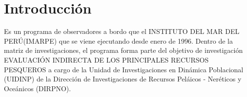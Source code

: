 \documentclass[a4paper,oneside,11pt]{book}
\begin{document}
\sloppy %
\frenchspacing %
\pagestyle{headings} %

\newcommand{\figura}[4]{
  \begin{figure} 
  \begin{center} 
  \texttt{[image: \#1]} 
  \caption{#3} 
  \label{#4} 
  \end{center} 
  \end{figure}} 

\newenvironment{tabla}[2]{ 
  \begin{table} 
  \begin{center} 
  \caption{#1} 
  \label{#2}}{\end{center} 
  \end{table}} 




\renewcommand{\contentsname}{CONTENIDO} 
\renewcommand{\partname}{Parte} 
\renewcommand{\chaptername}{Capítulo} 
\renewcommand{\appendixname}{Apéndice} 
\renewcommand{\bibname}{Bibliografía} 
\renewcommand{\figurename}{Figura} 
\renewcommand{\listfigurename}{Índice de figuras} 
\renewcommand{\tablename}{Tabla} 
\renewcommand{\listtablename}{Índice de tablas}  



\tableofcontents 

\chapter {Introducción}


Es un programa de observadores a bordo que el INSTITUTO DEL MAR DEL
PERÚ(IMARPE) que se viene ejecutando desde enero de 1996.
Dentro de la matriz de investigaciones, el programa forma parte del objetivo de
investigación EVALUACIÓN INDIRECTA DE LOS PRINCIPALES RECURSOS PESQUEROS a cargo de la Unidad de Investigaciones en Dinámica Poblacional (UIDINP) de la Dirección de Investigaciones de Recursos Peláicos - Neréticos y Oceánicos (DIRPNO).
\end{document}
